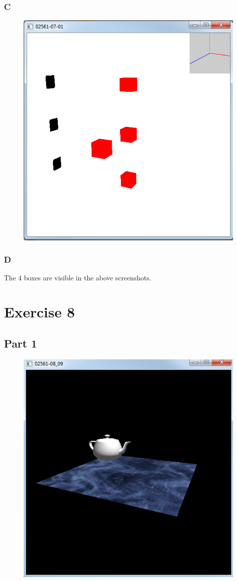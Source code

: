 \documentclass[11pt]{article}
\begin{document}
\subsubsection{C}
\begin{figure}[H]
	\centering
	\includegraphics[width=0.5\linewidth]{images/e07p1bigdist}
	\label{fig:e07p1bigdist}
\end{figure}

\subsubsection{D}
The 4 boxes are visible in the above screenshots.


\section{Exercise 8}
\subsection{Part 1}
\begin{figure}[H]
	\centering
	\includegraphics[width=0.5\linewidth]{images/e08p1}
	\label{fig:e08p1}
\end{figure}
\end{document}

